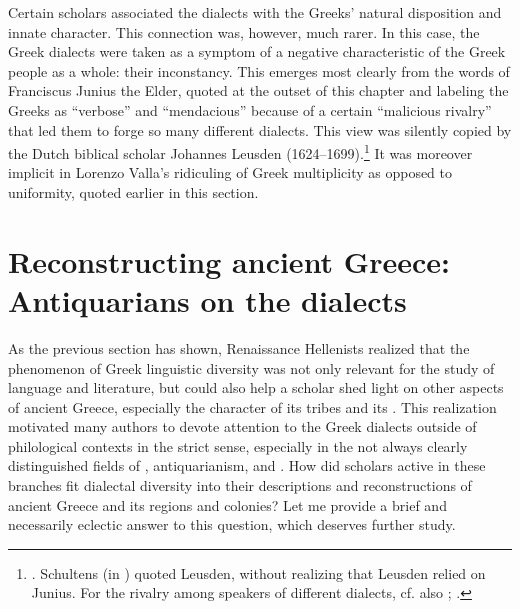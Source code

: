 Certain scholars associated the dialects with the Greeks’ natural disposition and innate character. This connection was, however, much rarer. In this case, the Greek dialects were taken as a symptom of a negative characteristic of the Greek people as a whole: their inconstancy. This emerges most clearly from the words of Franciscus Junius the Elder, quoted at the outset of this chapter and labeling the Greeks as “verbose” and “mendacious” because of a certain “malicious rivalry” that led them to forge so many different dialects. This view was silently copied by the Dutch biblical scholar Johannes Leusden (1624–1699).\footnote{\citet[a.4\textsc{\textsuperscript{r}}\textsc{–}a.4\textsc{\textsuperscript{v}}, 167]{Leusden1656}. Schultens (in \citet[§\textsc{xlix.}δ]{Eskhult_albert_nodate}) quoted Leusden, without realizing that Leusden relied on Junius. For the rivalry among speakers of different dialects, cf. also \citet[5\textsc{\textsuperscript{r}}]{Baile1588}; \citet[\textsc{b.3}\textsc{\textsuperscript{r}}]{Schorling1678}.} It was moreover implicit in Lorenzo Valla’s ridiculing of Greek multiplicity as opposed to  uniformity, quoted earlier in this section.

\section{Reconstructing ancient Greece: Antiquarians on the dialects}\label{sec:7.6}


As the previous section has shown, Renaissance Hellenists realized that the phenomenon of Greek linguistic diversity was not only relevant for the study of language and literature, but could also help a scholar shed light on other aspects of ancient Greece, especially the character of its tribes and its . This realization motivated many authors to devote attention to the Greek dialects outside of philological contexts in the strict sense, especially in the not always clearly distinguished fields of , antiquarianism, and . How did scholars active in these branches fit dialectal diversity into their descriptions and reconstructions of ancient Greece and its regions and colonies? Let me provide a brief and necessarily eclectic answer to this question, which deserves further study.

